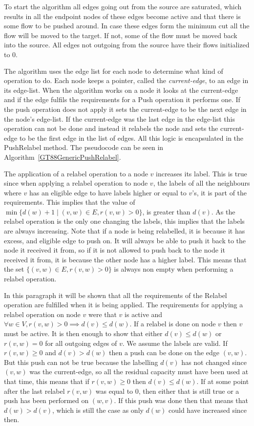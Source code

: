 To start the algorithm all edges going out from the source are saturated, which results in all the endpoint nodes of these edges become active and that there is 
some flow to be pushed around. In case these edges form the minimum cut all the flow will be moved to the target. If not, some of the flow must be moved 
back into the source. All edges not outgoing from the source have their flows initialized to 0.

The algorithm uses the edge list for each node to determine what kind of operation to do. Each node keeps a pointer, called the \emph{current-edge},  
to an edge in its edge-list. When the algorithm works on a node it looks at the current-edge and if the edge fulfils the requirements for a Push operation it
performs one. If the push operation does not apply it sets the current-edge to be the next edge in the node's edge-list. If the current-edge was the last edge
in the edge-list this operation can not be done and instead it relabels the node and sets the current-edge to be the first edge in the list of edges.
All this logic is encapsulated in the PushRelabel method. The pseudocode can be seen in Algorithm~\ref{GT88GenericPushRelabel}.

The application of a relabel operation to a node $v$ increases its label.
This is true since when applying a relabel operation to node $v$, the labels of all the neighbours where $v$ has an eligible edge to have 
labels higher or equal to $v$'s, it is part of the requirements. This implies that the value of $\min{\{d(w) + 1 \mid (v,w) \in E, r(v,w) > 0 \}}$, 
is greater than $d(v)$. As the relabel operation is the only one changing the labels, this implies that the labels are always increasing.
Note that if a node is being relabelled, it is because it has excess, and eligible edge to push on. 
It will always be able to push it back to the node it received it from, so if it is not allowed to push back to the node it received it from, it is because the other node has a higher label.
This means that the set $\{(v,w) \in E, r(v,w) > 0\}$ is always non empty when performing a relabel operation.

In this paragraph it will be shown that all the requirements of the Relabel operation are fulfilled when it is being applied.
The requirements for applying a relabel operation on 
node $v$ were that $v$ is active and $\forall w \in V, r(v,w) > 0 \implies d(v) \le d(w)$. If a relabel is done on node $v$ then $v$ must be active. 
It is then enough to show that either $d(v) \leq d(w)$ or $r(v,w) = 0$ for all outgoing edges of $v$. 
We assume the labels are valid. If $r(v,w) \geq 0$ and $d(v) > d(w)$ then a push can be done on the edge $(v,w)$. 
But this push can not be true because the labelling $d(v)$ has not changed since $(v,w)$ was the current-edge, so all the 
residual capacity must have been used at that time, this means that if $r(v,w) \geq 0$ then $d(v) \le d(w)$. 
If at some point after the last relabel $r(v,w)$ was equal to 0, then either that is still true or a push has been performed on $(w,v)$. If
this push was done then that means that $d(w) > d(v)$, which is still the case as only $d(w)$ could have increased since then. 

